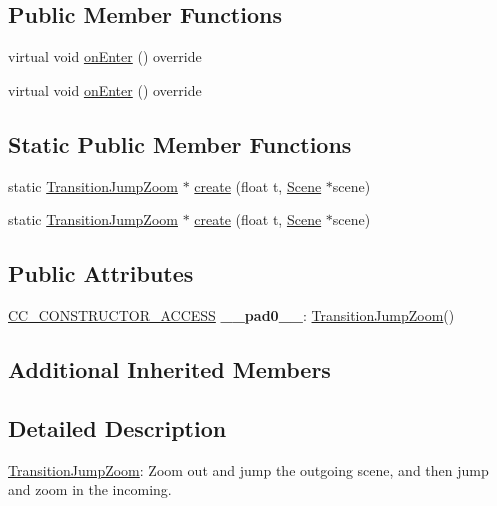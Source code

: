\subsection*{Public Member Functions}
\begin{DoxyCompactItemize}
\item 
virtual void \hyperlink{classTransitionJumpZoom_aa57e87e6adf5e62f533d5478fdd6155e}{on\+Enter} () override
\item 
virtual void \hyperlink{classTransitionJumpZoom_a06952f1bbf702804d28bda0923d9ca31}{on\+Enter} () override
\end{DoxyCompactItemize}
\subsection*{Static Public Member Functions}
\begin{DoxyCompactItemize}
\item 
static \hyperlink{classTransitionJumpZoom}{Transition\+Jump\+Zoom} $\ast$ \hyperlink{classTransitionJumpZoom_a407f747864b7015310107b8c2433bd73}{create} (float t, \hyperlink{classScene}{Scene} $\ast$scene)
\item 
static \hyperlink{classTransitionJumpZoom}{Transition\+Jump\+Zoom} $\ast$ \hyperlink{classTransitionJumpZoom_a9bfe4c4c71834e70c977b866e118dedc}{create} (float t, \hyperlink{classScene}{Scene} $\ast$scene)
\end{DoxyCompactItemize}
\subsection*{Public Attributes}
\begin{DoxyCompactItemize}
\item 
\mbox{\label{classTransitionJumpZoom_a40671e3cf228953e1af748558ab44cb0}} 
\hyperlink{_2cocos2d_2cocos_2base_2ccConfig_8h_a25ef1314f97c35a2ed3d029b0ead6da0}{C\+C\+\_\+\+C\+O\+N\+S\+T\+R\+U\+C\+T\+O\+R\+\_\+\+A\+C\+C\+E\+SS} {\bfseries \+\_\+\+\_\+pad0\+\_\+\+\_\+}\+: \hyperlink{classTransitionJumpZoom}{Transition\+Jump\+Zoom}()
\end{DoxyCompactItemize}
\subsection*{Additional Inherited Members}


\subsection{Detailed Description}
\hyperlink{classTransitionJumpZoom}{Transition\+Jump\+Zoom}\+: Zoom out and jump the outgoing scene, and then jump and zoom in the incoming. 


